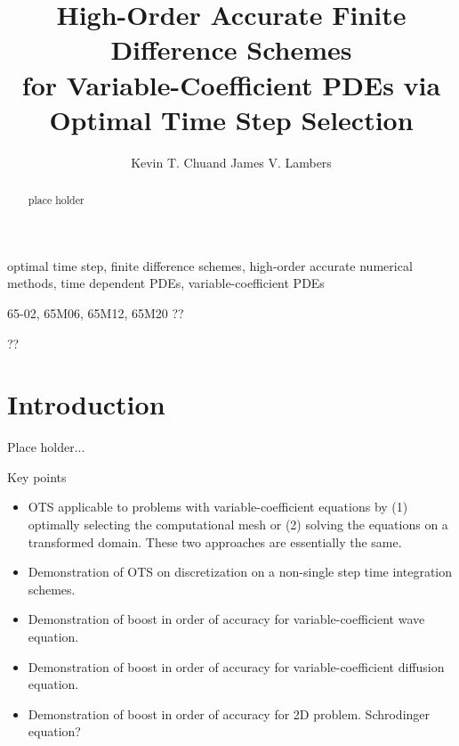\documentclass[oneeqnum,onefignum,onetabnum,onethmnum]{siamltex}
\title{High-Order Accurate Finite Difference Schemes \\
       for Variable-Coefficient PDEs via Optimal Time Step Selection}
\author{
Kevin T. Chu\footnotemark[2] \footnotemark[3]
and 
James V. Lambers\footnotemark[4]
}
\begin{document}

\maketitle

\renewcommand{\thefootnote}{\fnsymbol{footnote}}

\renewcommand{\thefootnote}{\fnsymbol{footnote}}

\renewcommand{\thefootnote}{\fnsymbol{footnote}}

\renewcommand{\thefootnote}{\arabic{footnote}}


\begin{abstract}
place holder
\end{abstract}


\begin{keywords}
optimal time step, finite difference schemes, high-order accurate numerical 
methods, time dependent PDEs, variable-coefficient PDEs
\end{keywords}

\begin{AMS}
65-02, 65M06, 65M12, 65M20 ??
\end{AMS}

\pagestyle{myheadings}
\thispagestyle{plain}
         {??}


\section*{Introduction}
Place holder...
\cite{zoppou1999, kreiss2002, guidotti2006}

Key points
\begin{itemize}
\item OTS applicable to problems with variable-coefficient equations by
      (1) optimally selecting the computational mesh or 
      (2) solving the equations on a transformed domain.  
      These two approaches are essentially the same.
\item Demonstration of OTS on discretization on a non-single step time 
      integration schemes.
\item Demonstration of boost in order of accuracy for variable-coefficient 
      wave equation. 
\item Demonstration of boost in order of accuracy for variable-coefficient 
      diffusion equation. 
\item Demonstration of boost in order of accuracy for 2D problem. Schrodinger
      equation?
\end{itemize}
\end{document}
